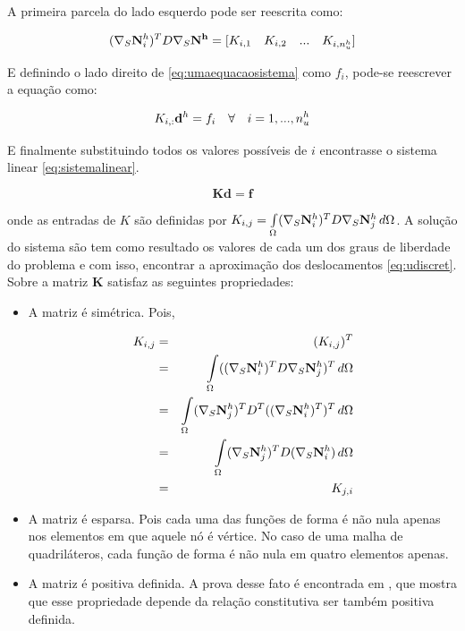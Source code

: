 A primeira parcela do lado esquerdo pode ser reescrita como:

\begin{equation}
     (\sopnabla \basefunctionfine)^T D \sopnabla \mathbf{N^h} = [K_{i,1}\quad  K_{i,2} \quad ... \quad K_{i,\freedomfine}] 
\end{equation}

E definindo o lado direito de \eqref{eq:umaequacaosistema} como $f_i$, pode-se reescrever a equação como:

\begin{equation} \label{eq:umaequacaosistemafim}
K_{i,:} \mathbf{d}^h = f_i \quad \forall \quad i=1,..., \freedomfine
\end{equation}

E finalmente substituindo todos os valores possíveis de $i$ encontrasse o sistema linear \eqref{eq:sistemalinear}.

\begin{equation}
    \mathbf{K} \mathbf{d} = \mathbf{f}
\end{equation}



onde as entradas de $K$ são definidas por  $K_{i,j} = \omeint{\kij{i}{j}}$. A solução do sistema são tem como resultado os valores de cada um dos graus de liberdade do problema e com isso, encontrar a aproximação dos deslocamentos \eqref{eq:udiscret}. Sobre a matriz $\mathbf{K}$ satisfaz as seguintes propriedades:


\begin{itemize}
    \item A matriz é simétrica. Pois,

    \begin{eqnarray}
    K_{i,j} & = & (K_{i,j})^T \\
            & = & \omeint{((\sopnabla \basefunctionfine)^T D \sopnabla \basefunctionfine[j])^T} \\
            & = & \omeint{ ( \sopnabla \basefunctionfine[j])^T D^T  ((\sopnabla \basefunctionfine)^T)^T}\\
            & = & \omeint{ ( \sopnabla \basefunctionfine[j])^T D  (\sopnabla \basefunctionfine)} \\
            & = & K_{j,i}
    \end{eqnarray}


    \item A matriz é esparsa. Pois cada uma das funções de forma é não nula apenas nos elementos em que aquele nó é vértice. No caso de uma malha de quadriláteros, cada função de forma é não nula em quatro elementos apenas.

    \item A matriz é positiva definida. A prova desse fato é encontrada em \cite{hughes}, que mostra que esse propriedade depende da relação constitutiva ser também positiva definida.
\end{itemize}


